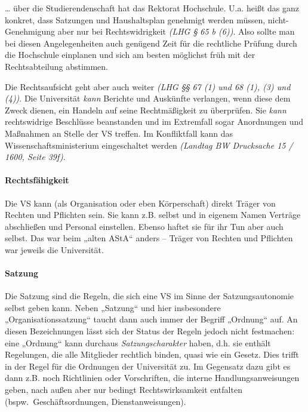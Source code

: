 \documentclass[
10pt,
a4paper,
twoside,								%
titlepage=false,							%
draft=false								%
]{scrartcl}
\begin{document}
… über die Studierendenschaft hat das Rektorat Hochschule. U.a. heißt das ganz konkret, dass Satzungen und Haushaltsplan genehmigt werden müssen, nicht-Genehmigung aber nur bei Rechtswidrigkeit \textit{(LHG § 65 b (6))}. Also sollte man bei diesen Angelegenheiten auch genügend Zeit für die rechtliche Prüfung durch die Hochschule einplanen und sich am besten möglichst früh mit der Rechtsabteilung abstimmen.

Die Rechtsaufsicht geht aber auch weiter \textit{(LHG §§ 67 (1) und 68 (1), (3) und (4))}. Die Universität \emph{kann} Berichte und Auskünfte verlangen, wenn diese dem Zweck dienen, ein Handeln auf seine Rechtmäßigkeit zu überprüfen. Sie \emph{kann} rechtswidrige Beschlüsse beanstanden und im Extremfall sogar Anordnungen und Maßnahmen an Stelle der VS treffen. Im Konfliktfall kann das Wissenschaftsministerium eingeschaltet werden \textit{(Landtag BW Drucksache 15 / 1600, Seite 39f)}.



\paragraph{Rechtsfähigkeit}

Die VS kann (als Organisation oder eben Körperschaft) direkt Träger von Rechten und Pflichten sein. Sie kann z.B. selbst und in eigenem Namen Verträge abschließen und Personal einstellen. Ebenso haftet sie für ihr Tun aber auch selbst. Das war beim „alten AStA“ anders – Träger von Rechten und Pflichten war jeweils die Universität.



\paragraph{Satzung}

Die Satzung sind die Regeln, die sich eine VS im Sinne der Satzungsautonomie selbst geben kann. Neben „Satzung“ und hier insbesondere „Organisationssatzung“ taucht dann auch immer der Begriff „Ordnung“ auf. An diesen Bezeichnungen lässt sich der Status der Regeln jedoch nicht festmachen: eine „Ordnung“ kann durchaus \emph{Satzungscharakter} haben, d.h. sie enthält Regelungen, die alle Mitglieder rechtlich binden, quasi wie ein Gesetz. Dies trifft in der Regel für die Ordnungen der Universität zu. Im Gegensatz dazu gibt es dann z.B. noch Richtlinien oder Vorschriften, die interne Handlungsanweisungen geben, nach außen aber nur bedingt Rechtswirksamkeit entfalten (bspw.~Geschäftsordnungen, Dienstanweisungen).
\end{document}
